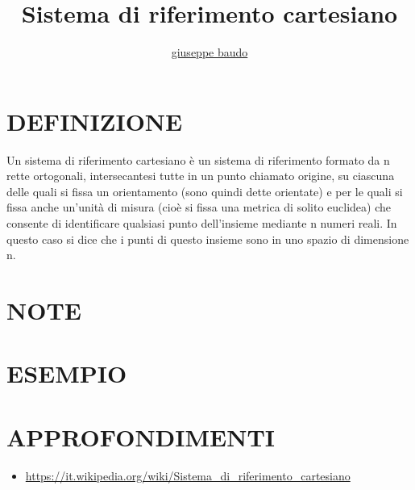 \documentclass[a4paper,10pt]{article}
\title{Sistema di riferimento cartesiano}
\author{\href{http://www.baudo.hol.es}{giuseppe baudo}}
\begin{document}
\maketitle

\section{DEFINIZIONE}
Un sistema di riferimento cartesiano è un sistema di riferimento formato da n rette ortogonali, intersecantesi tutte in un punto
chiamato origine, su ciascuna delle quali si fissa un orientamento (sono quindi dette orientate) e per le quali si fissa
anche un'unità di misura (cioè si fissa una metrica di solito euclidea) che consente di identificare qualsiasi punto dell'insieme
mediante n numeri reali. In questo caso si dice che i punti di questo insieme sono in uno spazio di dimensione n.

\section{NOTE}


\section{ESEMPIO}

\section{APPROFONDIMENTI}
\begin{itemize}
 \item \href{https://it.wikipedia.org/wiki/Sistema_di_riferimento_cartesiano}{https://it.wikipedia.org/wiki/Sistema_di_riferimento_cartesiano}
\end{itemize}
\end{document}
